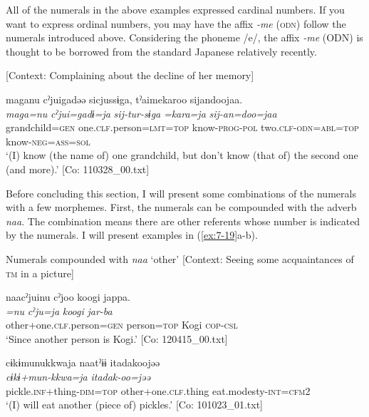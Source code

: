   All of the numerals in the above examples expressed cardinal numbers. If you want to express ordinal numbers, you may have the affix \textit{{}-me} (\textsc{odn}) follow the numerals introduced above. Considering the phoneme /e/, the affix \textit{{}-me} (ODN) is thought to be borrowed from the standard Japanese relatively recently.

\ea \label{ex:7:18}  [Context: Complaining about the decline of her memory]

{\TM}
\glll  maganu  cˀjuigadəə  sicjussɨga,   tˀaimekaroo  sijandoojaa.\\
\textit{maga=nu}  \textit{cˀjui=gadɨ=ja}  \textit{sij-tur-sɨga}  \textit{=kara=ja}  \textit{sij-an=doo=jaa}\\
grandchild=\textsc{gen}  one.\textsc{clf}.person=\textsc{lmt}=\textsc{top}  know-\textsc{prog}-\textsc{pol}            two.\textsc{clf}-\textsc{odn}=\textsc{abl}=\textsc{top}  know-\textsc{neg}=\textsc{ass}=\textsc{sol}\\
\glt ‘(I) know (the name of) one grandchild, but don’t know (that of) the second one (and more).’ [Co: 110328\_00.txt]

\z

Before concluding this section, I will present some combinations of the numerals with a few morphemes. First, the numerals can be compounded with the adverb \textit{naa}. The combination means there are other referents whose number is indicated by the numerals. I will present examples in (\ref{ex:7-19}a-b).

\ea \label{ex:7:19}  Numerals compounded with \textit{naa} ‘other’
\ea \label{ex:7:19a}[Context: Seeing some acquaintances of \textsc{tm} in a picture]

{\TM}
\glll  naacˀjuinu  cˀjoo  koogi  jappa.\\
\textit{=nu}  \textit{cˀju=ja}  \textit{koogi}  \textit{jar-ba}\\
other+one.\textsc{clf}.person=\textsc{gen}  person=\textsc{top}  Kogi  \textsc{cop}-\textsc{csl}\\
\glt ‘Since another person is Kogi.’ [Co: 120415\_00.txt]

\ex \label{ex:7:19b}
{\MY}
\glll cɨkɨmunukkwaja  naatˀɨɨ  {\textbar}itadak{\textbar}oojəə\\
      \textit{cɨkɨ+mun-kkwa=ja}  \textit{}  \textit{itadak-oo=jəə}\\
      pickle.\textsc{inf}+thing-\textsc{dim}=\textsc{top}  other+one.\textsc{clf}.thing  eat.modesty-\textsc{int}=\textsc{cfm}2\\
\glt    ‘(I) will eat another (piece of) pickles.’       [Co: 101023\_01.txt]

